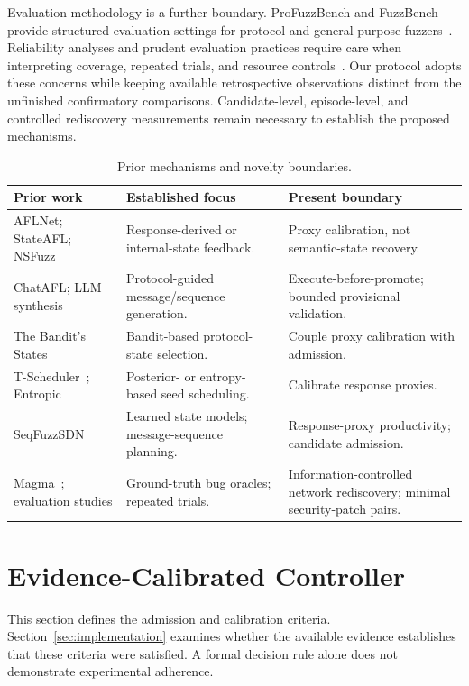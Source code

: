 \documentclass[final,5p,times,number]{elsarticle}
\begin{document}
Evaluation methodology is a further boundary. ProFuzzBench and FuzzBench provide structured evaluation settings for protocol and general-purpose fuzzers~\cite{profuzzbench_benchmark_stateful_protocol_2021,fuzzbench2021}. Reliability analyses and prudent evaluation practices require care when interpreting coverage, repeated trials, and resource controls~\cite{reliability_benchmarking_2022,sok_prudent_evaluation_practices_2024}. Our protocol adopts these concerns while keeping available retrospective observations distinct from the unfinished confirmatory comparisons. Candidate-level, episode-level, and controlled rediscovery measurements remain necessary to establish the proposed mechanisms.

\begin{table}[!tbp]
\centering\small
\caption{Prior mechanisms and novelty boundaries.}
\label{tab:novelty}
\begin{tabularx}{\textwidth}{l Y Y}
\toprule
Prior work & Established focus & Present boundary \\
\midrule
AFLNet; StateAFL; NSFuzz & Response-derived or internal-state feedback. & Proxy calibration, not semantic-state recovery. \\
ChatAFL; LLM synthesis & Protocol-guided message/sequence generation. & Execute-before-promote; bounded provisional validation. \\
The Bandit's States~\cite{bandits_states2023} & Bandit-based protocol-state selection. & Couple proxy calibration with admission. \\
T-Scheduler~\cite{tscheduler2024}; Entropic~\cite{entropic2020} & Posterior- or entropy-based seed scheduling. & Calibrate response proxies. \\
SeqFuzzSDN~\cite{seqfuzzsdn2026} & Learned state models; message-sequence planning. & Response-proxy productivity; candidate admission. \\
Magma~\cite{magma2020}; evaluation studies & Ground-truth bug oracles; repeated trials. & Information-controlled network rediscovery; minimal security-patch pairs. \\
\bottomrule
\end{tabularx}
\end{table}

\section{Evidence-Calibrated Controller}
\label{sec:design}
This section defines the admission and calibration criteria. Section~\ref{sec:implementation} examines whether the available evidence establishes that these criteria were satisfied. A formal decision rule alone does not demonstrate experimental adherence.
\end{document}
